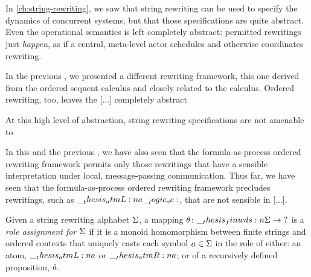 \section{}

In \cref{ch:string-rewriting}, we saw that string rewriting can be used to specify the dynamics of concurrent systems, but that those specifications are quite abstract.
Even the operational semantics is left completely abstract: permitted rewritings just \emph{happen}, as if a central, meta-level actor schedules and otherwise coordinates rewriting.

In the previous , we presented a different rewriting framework, this one derived from the ordered sequent calculus and closely related to the \citeauthor{Lambek:AMM58} calculus\autocite{Lambek:AMM58}.
Ordered rewriting, too, leaves the [...] completely abstract

At this high level of abstraction, string rewriting specifications are not amenable to 

In this and the previous , we have also seen that the formula-as-process ordered rewriting framework permits only those rewritings that have a sensible interpretation under local, message-passing communication.
Thus far, we have seen that the formula-as-process ordered rewriting framework precludes rewritings, such as $\__thesis_atmL:n {a} \__logic_oc: $, that are not sensible in [...].


Given a string rewriting alphabet $\Sigma$, a mapping $\theta\colon \__thesis_finwds:n {\Sigma} \to {?}$ is a \emph{role assignment for $\Sigma$} if it is a monoid homomorphism between finite strings and ordered contexts that uniquely casts each symbol $a \in \Sigma$ in the role of either: an atom, $\__thesis_atmL:n {a}$ or $\__thesis_atmR:n {a}$; or of a recursively defined proposition, $\hat{a}$.

